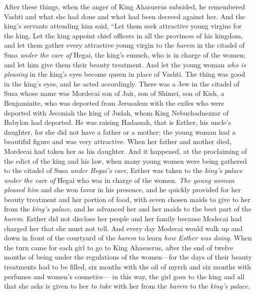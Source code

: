 \begin{biblechapter} %
 After these things, when the anger of King Ahasuerus subsided, he remembered Vashti and what she had done and what had been decreed against her.
\verse And the king’s servants attending him said, “Let them seek attractive young virgins for the king.
\verse Let the king appoint chief officers in all the provinces of his kingdom, and let them gather every attractive young virgin to the \textit{harem} in the citadel of Susa \textit{under the care of} Hegai, the king’s eunuch, who is in charge of the women; and let him give them their beauty treatment.
\verse And let the young woman \textit{who is pleasing} in the king’s eyes become queen in place of Vashti. The thing was good in the king’s eyes, and he acted accordingly.
\verse There was a Jew in the citadel of Susa whose name was Mordecai son of Jair, son of Shimei, son of Kish, a Benjaminite,
\verse who was deported from Jerusalem with the exiles who were deported with Jeconiah the king of Judah, whom King Nebuchadnezzar of Babylon had deported.
\verse He was raising Hadassah, that is Esther, his uncle’s daughter, for she did not have a father or a mother; the young woman had a beautiful figure and was very attractive. When her father and mother died, Mordecai had taken her as his daughter.
\verse And it happened, at the proclaiming of the edict of the king and his law, when many young women were being gathered to the citadel of Susa \textit{under Hegai’s care}, Esther was taken to the \textit{king’s palace} \textit{under the care of} Hegai who was in charge of the women.
\verse \textit{The young woman pleased him} and she won favor in his presence, and he quickly provided for her beauty treatment and her portion of food, with seven chosen maids to give to her from the \textit{king’s palace}, and he advanced her and her maids to the best part of the \textit{harem}.
\verse Esther did not disclose her people and her family because Modecai had charged her that she must not tell.
\verse And every day Modecai would walk up and down in front of the courtyard of the \textit{harem} to learn \textit{how Esther was doing}.
\verse When the turn came for each girl to go to King Ahasuerus, after the end of twelve months of being under the regulations of the women—for the days of their beauty treatments had to be filled, six months with the oil of myrrh and six months with perfumes and women’s cosmetics—
\verse in this way, the girl goes to the king and all that she asks is given to her \textit{to take} with her from the \textit{harem} to the \textit{king’s palace}.

\end{biblechapter}
